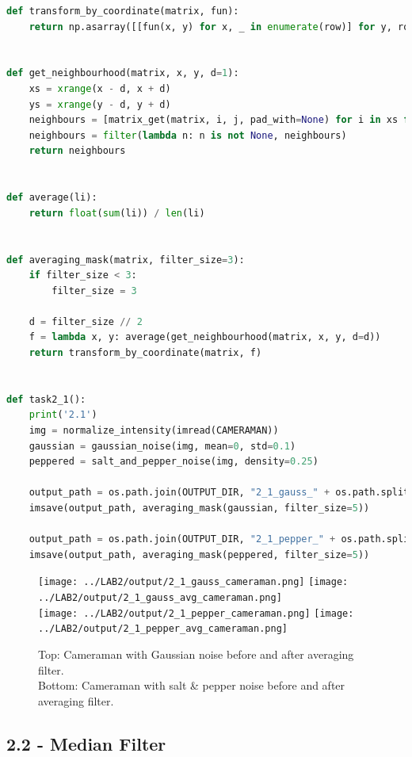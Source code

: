 \begin{lstlisting}[language=Python, label=averaging_filter, caption=Averaging Filter]
def transform_by_coordinate(matrix, fun):
    return np.asarray([[fun(x, y) for x, _ in enumerate(row)] for y, row in enumerate(matrix)])


def get_neighbourhood(matrix, x, y, d=1):
    xs = xrange(x - d, x + d)
    ys = xrange(y - d, y + d)
    neighbours = [matrix_get(matrix, i, j, pad_with=None) for i in xs for j in ys]
    neighbours = filter(lambda n: n is not None, neighbours)
    return neighbours


def average(li):
    return float(sum(li)) / len(li)


def averaging_mask(matrix, filter_size=3):
    if filter_size < 3:
        filter_size = 3

    d = filter_size // 2
    f = lambda x, y: average(get_neighbourhood(matrix, x, y, d=d))
    return transform_by_coordinate(matrix, f)


def task2_1():
    print('2.1')
    img = normalize_intensity(imread(CAMERAMAN))
    gaussian = gaussian_noise(img, mean=0, std=0.1)
    peppered = salt_and_pepper_noise(img, density=0.25)

    output_path = os.path.join(OUTPUT_DIR, "2_1_gauss_" + os.path.split(CAMERAMAN)[-1])
    imsave(output_path, averaging_mask(gaussian, filter_size=5))

    output_path = os.path.join(OUTPUT_DIR, "2_1_pepper_" + os.path.split(CAMERAMAN)[-1])
    imsave(output_path, averaging_mask(peppered, filter_size=5))
\end{lstlisting}

\newpage
\begin{figure}[h!]
    \centering
    \texttt{[image: ../LAB2/output/2\_1\_gauss\_cameraman.png]}
    \texttt{[image: ../LAB2/output/2\_1\_gauss\_avg\_cameraman.png]} \\
    \texttt{[image: ../LAB2/output/2\_1\_pepper\_cameraman.png]}
    \texttt{[image: ../LAB2/output/2\_1\_pepper\_avg\_cameraman.png]}
    \caption{Top: Cameraman with Gaussian noise before and after averaging filter. \\ Bottom: Cameraman with salt \& pepper noise before and after averaging filter.}
    \label{avg_filter_results}
\end{figure}


\newpage
\subsection*{2.2 - Median Filter}

